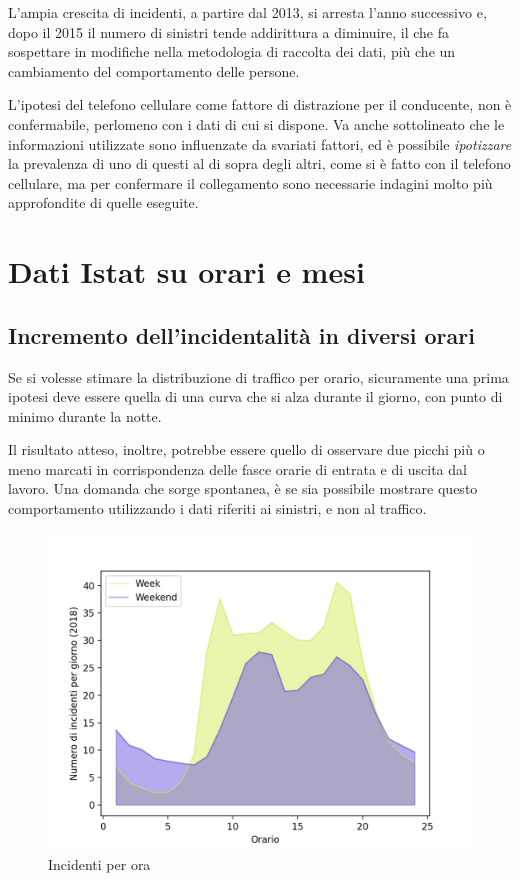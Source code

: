 \documentclass[a4paper,12pt]{report}
\newcommand{\quotestyle}[1]{\textit{#1}}
\begin{document}
L'ampia crescita di incidenti, a partire dal 2013, si arresta l'anno successivo e, 
dopo il 2015 il numero di sinistri tende addirittura a diminuire, 
il che fa sospettare 
in modifiche nella metodologia di raccolta dei dati, più che un cambiamento 
del comportamento delle persone. 

L'ipotesi del telefono cellulare come fattore di distrazione per il conducente, 
non è confermabile, perlomeno con i dati di cui si dispone. 
Va anche sottolineato che le informazioni utilizzate sono influenzate da svariati fattori, ed è 
possibile \quotestyle{ipotizzare} la prevalenza di uno di questi al di sopra degli altri, 
come si è fatto con il telefono cellulare, 
ma per confermare il collegamento sono necessarie indagini molto più approfondite di 
quelle eseguite. 

\section{Dati Istat su orari e mesi}

\subsection{Incremento dell'incidentalità in diversi orari}

Se si volesse stimare la distribuzione di traffico per orario, sicuramente una prima ipotesi 
deve essere quella di una curva che si alza durante il giorno, con 
punto di minimo durante la notte. 

Il risultato atteso, inoltre, potrebbe essere 
quello di osservare due picchi più o meno marcati 
in corrispondenza delle fasce orarie di entrata e di uscita dal lavoro.
Una domanda che sorge spontanea, 
è se sia possibile mostrare questo comportamento utilizzando i dati 
riferiti ai sinistri, e non al traffico.

\begin{figure}
    \includegraphics[width=\linewidth]{../src/incidenti/incidenti_senza_coords/ore_punta/week_weekend.png}
    \caption{Incidenti per ora}
    \label{fig:week-weekend}
\end{figure}
\end{document}
